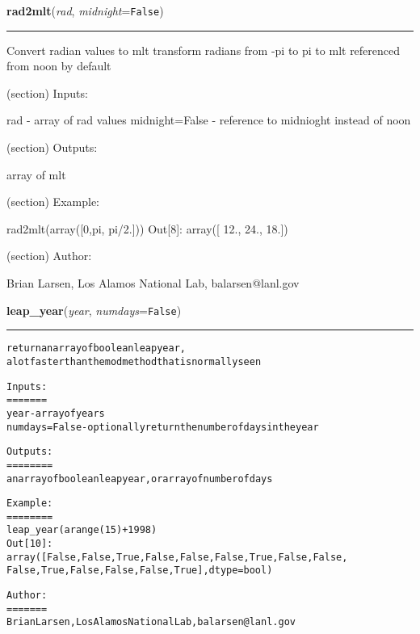 \hspace{.8\funcindent}\begin{boxedminipage}{\funcwidth}

    \raggedright \textbf{rad2mlt}(\textit{rad}, \textit{midnight}={\tt False})

    \vspace{-1.5ex}

    \rule{\textwidth}{0.5\fboxrule}
\setlength{\parskip}{2ex}
    Convert radian values to mlt transform radians from -pi to pi to mlt 
    referenced from noon by default

    (section) Inputs:

      rad - array of rad values midnight=False - reference to midnioght 
      instead of noon

    (section) Outputs:

      array of mlt

    (section) Example:

      rad2mlt(array([0,pi, pi/2.])) Out[8]: array([ 12.,  24.,  18.])

    (section) Author:

      Brian Larsen, Los Alamos National Lab, balarsen@lanl.gov

\setlength{\parskip}{1ex}
    \end{boxedminipage}

    \label{spacepy:toolbox:leap_year}

    \vspace{0.5ex}

\hspace{.8\funcindent}\begin{boxedminipage}{\funcwidth}

    \raggedright \textbf{leap\_year}(\textit{year}, \textit{numdays}={\tt False})

    \vspace{-1.5ex}

    \rule{\textwidth}{0.5\fboxrule}
\setlength{\parskip}{2ex}
\begin{alltt}
return an array of boolean leap year, 
a lot faster than the mod method that is normally seen

Inputs:
=======
year - array of years
numdays=False - optionally return the number of days in the year

Outputs:
========
an array of boolean leap year, or array of number of days

Example:
========
leap\_year(arange(15)+1998)
Out[10]: 
array([False, False,  True, False, False, False,  True, False, False,
   False,  True, False, False, False,  True], dtype=bool)

Author:
=======
Brian Larsen, Los Alamos National Lab, balarsen@lanl.gov
\end{alltt}

\setlength{\parskip}{1ex}
    \end{boxedminipage}

